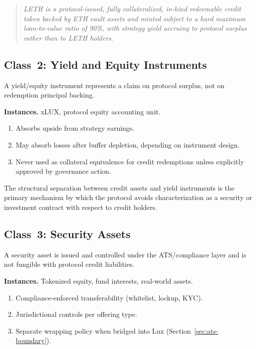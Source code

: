 \begin{quote}
\emph{LETH is a protocol-issued, fully collateralized, in-kind redeemable credit token backed by ETH vault assets and minted subject to a hard maximum loan-to-value ratio of 90\%, with strategy yield accruing to protocol surplus rather than to LETH holders.}
\end{quote}


\subsection{Class~2: Yield and Equity Instruments}
\label{sec:yield}

\begin{definition}
A yield/equity instrument represents a claim on protocol surplus, not on redemption principal backing.
\end{definition}

\noindent\textbf{Instances.} xLUX, protocol equity accounting unit.

\begin{requirement}
\label{req:yield}
\begin{enumerate}[nosep]
  \item Absorbs upside from strategy earnings.
  \item May absorb losses after buffer depletion, depending on instrument design.
  \item Never used as collateral equivalence for credit redemptions unless explicitly approved by governance action.
\end{enumerate}
\end{requirement}

The structural separation between credit assets and yield instruments is the primary mechanism by which the protocol avoids characterization as a security or investment contract with respect to credit holders.


\subsection{Class~3: Security Assets}
\label{sec:security}

\begin{definition}
A security asset is issued and controlled under the ATS/compliance layer and is not fungible with protocol credit liabilities.
\end{definition}

\noindent\textbf{Instances.} Tokenized equity, fund interests, real-world assets.

\begin{requirement}
\label{req:security}
\begin{enumerate}[nosep]
  \item Compliance-enforced transferability (whitelist, lockup, KYC).
  \item Jurisdictional controls per offering type.
  \item Separate wrapping policy when bridged into Lux (Section~\ref{sec:ats-boundary}).
\end{enumerate}
\end{requirement}



